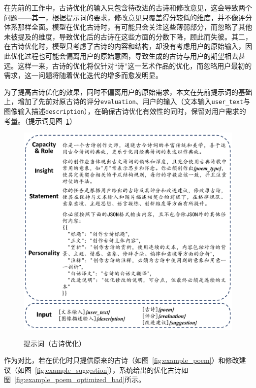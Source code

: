 在先前的工作中，古诗优化的输入只包含待改进的古诗和修改意见，这会导致两个问题——其一，根据提示词的要求，修改意见只覆盖得分较低的维度，并不像评分体系那样全面。模型在优化古诗时，有可能只会关注这些薄弱部分，而忽略了其他未被提及的维度，导致优化后的古诗在这些方面的分数下降，顾此而失彼。其二，在古诗优化时，模型只考虑了古诗的内容和结构，却没有考虑用户的原始输入，因此优化过程也可能会偏离用户的原始意图，导致生成的古诗与用户的期望相去甚远。这样一来，古诗的优化将仅针对“诗”这一艺术作品的优化，而忽略用户最初的需求，这一问题将随着优化迭代的增多而愈发明显。

为了提高古诗优化的效果，同时不偏离用户的原始需求，本文在先前提示词的基础上，增加了先前对原古诗的评分\verb|evaluation|、用户的输入（文本输入\verb|user_text|与图像输入描述\verb|description|），在确保古诗优化有效性的同时，保留对用户需求的考量。（提示词见图~\ref{fig:prompt_poem_optimization}）

\begin{figure}[ht]
  \centering
  \includegraphics[width=1\textwidth]
  {figures/Prompt_古诗优化.pdf}\\
  \caption{提示词（古诗优化）}
  \label{fig:prompt_poem_optimization} %
\end{figure}


作为对比，若在优化时只提供原来的古诗（如图~\ref{fig:example_poem}）和修改建议（如图~\ref{fig:example_suggestion}），系统给出的优化古诗如图~\ref{fig:example_poem_optimized_bad}所示。

